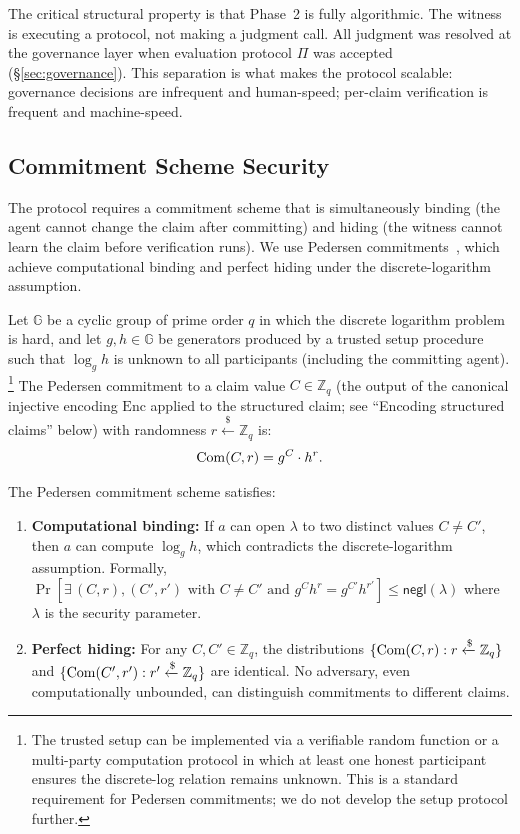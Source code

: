 The critical structural property is that Phase~2 is fully algorithmic.
The witness is executing a protocol, not making a judgment call.  All
judgment was resolved at the governance layer when evaluation protocol $\Pi$ was
accepted (\S\ref{sec:governance}).  This separation is what makes the
protocol scalable: governance decisions are infrequent and human-speed;
per-claim verification is frequent and machine-speed.

\subsection{Commitment Scheme Security}
\label{sec:commitment_security}

The protocol requires a commitment scheme that is simultaneously binding
(the agent cannot change the claim after committing) and hiding (the
witness cannot learn the claim before verification runs).  We use
Pedersen commitments~\citep{pedersen1992non}, which achieve computational
binding and perfect hiding under the discrete-logarithm assumption.

Let $\mathbb{G}$ be a cyclic group of prime order $q$ in which the
discrete logarithm problem is hard, and let $g, h \in \mathbb{G}$ be
generators produced by a trusted setup procedure such that $\log_g h$
is unknown to all participants (including the committing agent).%
\footnote{The trusted setup can be implemented via a verifiable random
function or a multi-party computation protocol in which at least one
honest participant ensures the discrete-log relation remains unknown.
This is a standard requirement for Pedersen commitments; we do not
develop the setup protocol further.}
The Pedersen commitment to a claim value $C \in \mathbb{Z}_q$ (the
output of the canonical injective encoding $\mathrm{Enc}$ applied to
the structured claim; see ``Encoding structured claims'' below) with
randomness
$r \xleftarrow{\$} \mathbb{Z}_q$ is:
\[
    \mathrm{Com}(C, r) = g^C \cdot h^r.
\]

\begin{proposition}
\label{prop:pedersen_security}
The Pedersen commitment scheme satisfies:
\begin{enumerate}
    \item[(a)] \textbf{Computational binding:}  If $a$ can open
    $\lambda$ to two distinct values $C \neq C'$, then $a$ can compute
    $\log_g h$, which contradicts the discrete-logarithm assumption.
    Formally, $\Pr[\exists\, (C, r), (C', r')\text{ with } C \neq C'
    \text{ and } g^C h^r = g^{C'} h^{r'}] \leq \mathsf{negl}(\lambda)$
    where $\lambda$ is the security parameter.
    \item[(b)] \textbf{Perfect hiding:}  For any $C, C' \in
    \mathbb{Z}_q$, the distributions $\{\mathrm{Com}(C, r) : r
    \xleftarrow{\$} \mathbb{Z}_q\}$ and $\{\mathrm{Com}(C', r') : r'
    \xleftarrow{\$} \mathbb{Z}_q\}$ are identical.  No adversary, even
    computationally unbounded, can distinguish commitments to different
    claims.
\end{enumerate}
\end{proposition}

